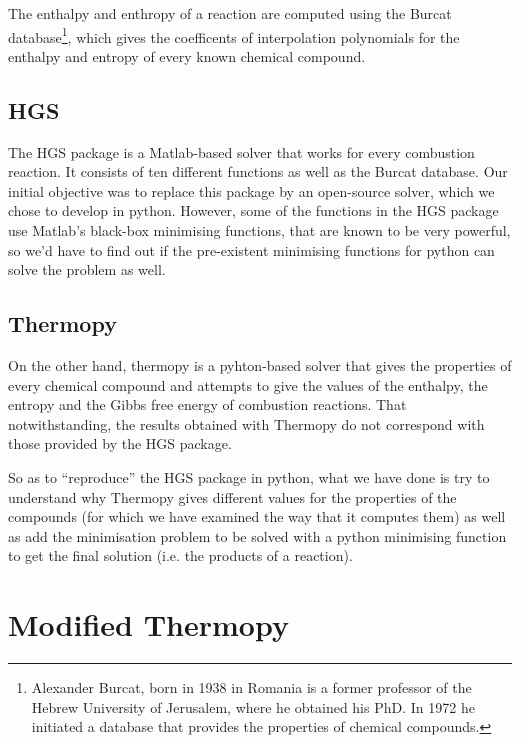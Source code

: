 \documentclass[a4paper,10pt]{article}
\theoremstyle{plain}
\theoremstyle{definition}
\theoremstyle{remark}
\newcommand{\quotes}[1]{``#1''}
\begin{document}
The enthalpy and enthropy of a reaction are computed using the Burcat database\footnote{Alexander Burcat, born in 1938 in Romania is a former professor of the Hebrew University of Jerusalem, where he obtained his PhD. In 1972 he initiated a database that provides the properties of chemical compounds.}, which gives the coefficents of interpolation polynomials for the enthalpy and entropy of every known chemical compound.
\subsection{HGS}
The HGS package is a Matlab-based solver that works for every combustion reaction. It consists of ten different functions as well as the Burcat database. Our initial objective was to replace this package by an open-source solver, which we chose to develop in python. However, some of the functions in the HGS package use Matlab's black-box minimising functions, that are known to be very powerful, so we'd have to find out if the pre-existent minimising functions for python can solve the problem as well.
\subsection{Thermopy}
On the other hand, thermopy is a pyhton-based solver that gives the properties of every chemical compound and attempts to give the values of the enthalpy, the entropy and the Gibbs free energy of combustion reactions. That notwithstanding, the results obtained with Thermopy do not correspond with those provided by the HGS package.

So as to \quotes{reproduce} the HGS package in python, what we have done is try to understand why Thermopy gives different values for the properties of the compounds (for which we have examined the way that it computes them) as well as add the minimisation problem to be solved with a python minimising function to get the final solution (i.e. the products of a reaction).

\section{Modified Thermopy}
\end{document}
